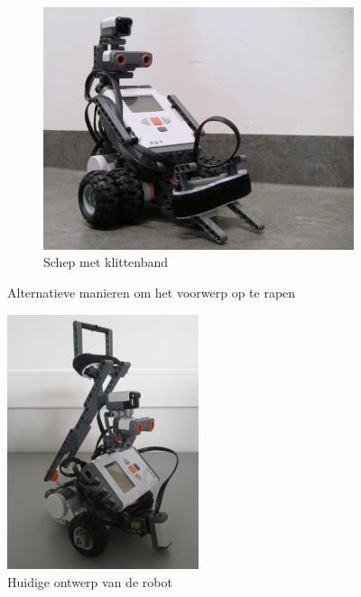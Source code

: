 \documentclass[eind]{penoverslag}
\begin{document}
\begin{figure}
\begin{subfigure}[h]{0.325\textwidth}
		\centering
		\includegraphics[width=\textwidth]{robotOud3}
		\caption{Schep met klittenband}
		\label{fig:robotOud3}
	\end{subfigure}
\caption{Alternatieve manieren om het voorwerp op te rapen}
\label{fig:robotOud}
\end{figure}

\begin{figure}
\centering
	\includegraphics[width=0.5\textwidth]{robotNieuw}
\caption{Huidige ontwerp van de robot}
\label{fig:robotBouw}
\end{figure}
\end{document}
